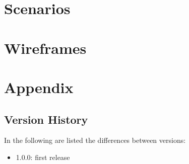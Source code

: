 \documentclass{../Common/Structure/doc_pdf}
\begin{document}
\chapter{Scenarios}
\thispagestyle{fancy}

\chapter{Wireframes}
\thispagestyle{fancy}

\appendix
\chapter{Appendix}
\section{Version History}
In the following are listed the differences between versions:
\begin{itemize}
	\item 1.0.0: first release
\end{itemize}
\end{document}
